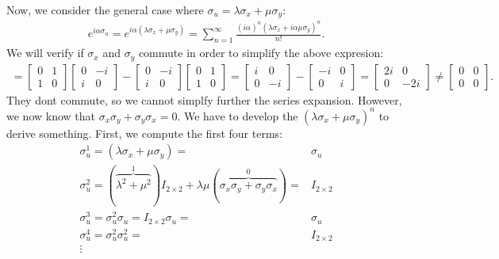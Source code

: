 \documentclass[letterpaper,11pt,twoside]{article}
\begin{document}
Now, we consider the general case where $\sigma_u=\lambda\sigma_x+\mu\sigma_y$:
\begin{align*}
  e^{i\alpha\sigma_u}=e^{i\alpha(\lambda\sigma_x+\mu\sigma_y)}=\sum_{n=1}^\infty\frac{(i\alpha)^n(\lambda\sigma_x+i\alpha\mu\sigma_y)^n}{n!}.
\end{align*}
We will verify if $\sigma_x$ and $\sigma_y$ commute in order to simplify the above expresion:
\begin{align*}
  [\sigma_x,\sigma_y]=\begin{bmatrix}
    0&1\\1&0
  \end{bmatrix}\begin{bmatrix}
    0&-i\\i&0
  \end{bmatrix}-\begin{bmatrix}
    0&-i\\i&0
  \end{bmatrix}\begin{bmatrix}
    0&1\\1&0
  \end{bmatrix}=\begin{bmatrix}
    i&0\\0&-i
  \end{bmatrix}-\begin{bmatrix}
    -i&0\\0&i
  \end{bmatrix}=\begin{bmatrix}
    2i&0\\0&-2i
  \end{bmatrix}\neq\begin{bmatrix}
    0&0\\0&0
  \end{bmatrix}.
\end{align*}
They dont commute, so we cannot simplfy further the series expansion. However, we now know that $\sigma_x\sigma_y+\sigma_y\sigma_x=0$. We have to 
develop the $(\lambda\sigma_x+\mu\sigma_y)^n$ to derive something. First, we compute the first four terms:
{\small
\begin{align*}
    \sigma_u^1=(\lambda\sigma_x+\mu\sigma_y)=&\sigma_u\\
    \sigma_u^2=(\overbrace{\lambda^2+\mu^2}^{1})I_{2\times2}+\lambda\mu(\overbrace{\sigma_x\sigma_y+\sigma_y\sigma_x}^{0})=&I_{2\times2}\\
    \sigma_u^3=\sigma_u^2\sigma_u=I_{2\times2}\sigma_u=&\sigma_u\\
    \sigma_u^4=\sigma_u^2\sigma_u^2=&I_{2\times2}\\
    \vdots&
\end{align*}}
\end{document}
